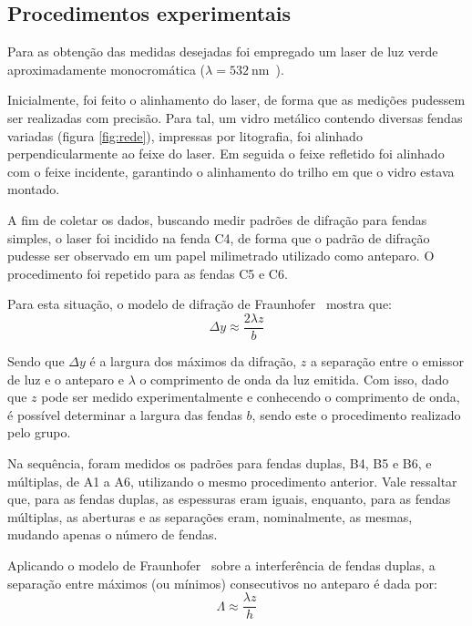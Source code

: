 \subsection{Procedimentos experimentais}

Para as obtenção das medidas desejadas foi empregado um laser de luz verde aproximadamente monocromática ($\lambda = \SI{532}{\nano\meter}$~\cite{ref:roteiro}).

Inicialmente, foi feito o alinhamento do laser, de forma que as medições pudessem ser realizadas com precisão. Para tal, um vidro metálico contendo diversas fendas variadas (figura \ref{fig:rede}), impressas por litografia, foi alinhado perpendicularmente ao feixe do laser. Em seguida o feixe refletido foi alinhado com o feixe incidente, garantindo o alinhamento do trilho em que o vidro estava montado.



A fim de coletar os dados, buscando medir padrões de difração para fendas simples, o laser foi incidido na fenda C4, de forma que o padrão de difração pudesse ser observado em um papel milimetrado utilizado como anteparo. O procedimento foi repetido para as fendas C5 e C6.

Para esta situação, o modelo de difração de Fraunhofer~\cite{ref:otica} mostra que:
\begin{equation*}
    \Delta y \approx \frac{2 \lambda z}{b} \label{eq:difr}
\end{equation*}

Sendo que $\Delta y$ é a largura dos máximos da difração, $z$ a separação entre o emissor de luz e o anteparo e $\lambda$ o comprimento de onda da luz emitida. Com isso, dado que $z$ pode ser medido experimentalmente e conhecendo o comprimento de onda, é possível determinar a largura das fendas $b$, sendo este o procedimento realizado pelo grupo.

Na sequência, foram medidos os padrões para fendas duplas, B4, B5 e B6, e múltiplas, de A1 a A6, utilizando o mesmo procedimento anterior. Vale ressaltar que, para as fendas duplas, as espessuras eram iguais, enquanto, para as fendas múltiplas, as aberturas e as separações eram, nominalmente, as mesmas, mudando apenas o número de fendas.

Aplicando o modelo de Fraunhofer~\cite{ref:otica} sobre a interferência de fendas duplas, a separação entre máximos (ou mínimos) consecutivos no anteparo é dada por:
\begin{equation}
    \Lambda \approx \frac{\lambda z}{h} \label{eq:duplas}
\end{equation}

